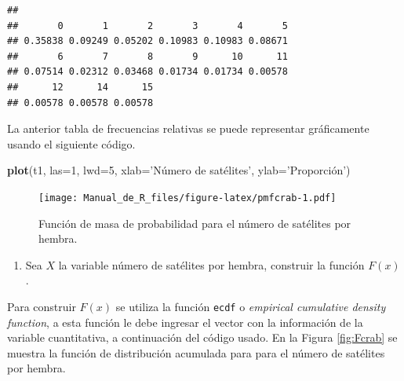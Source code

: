\documentclass[10pt,]{krantz}
\makeatletter
\newenvironment{Shaded}{\begin{snugshade}}{\end{snugshade}}
\newcommand{\KeywordTok}[1]{\textcolor[rgb]{0.13,0.29,0.53}{\textbf{{#1}}}}
\newcommand{\DataTypeTok}[1]{\textcolor[rgb]{0.13,0.29,0.53}{{#1}}}
\newcommand{\DecValTok}[1]{\textcolor[rgb]{0.00,0.00,0.81}{{#1}}}
\newcommand{\StringTok}[1]{\textcolor[rgb]{0.31,0.60,0.02}{{#1}}}
\newcommand{\NormalTok}[1]{{#1}}
\providecommand{\tightlist}{%
  \setlength{\itemsep}{0pt}\setlength{\parskip}{0pt}}
\newenvironment{kframe}{%
\medskip{}
\setlength{\fboxsep}{.8em}
 \def\at@end@of@kframe{}%
 \ifinner\ifhmode%
  \def\at@end@of@kframe{\end{minipage}}%
  \begin{minipage}{\columnwidth}%
 \fi\fi%
 \def\FrameCommand##1{\hskip\@totalleftmargin \hskip-\fboxsep
 \colorbox{shadecolor}{##1}\hskip-\fboxsep
     \hskip-\linewidth \hskip-\@totalleftmargin \hskip\columnwidth}%
 \MakeFramed {\advance\hsize-\width
   \@totalleftmargin\z@ \linewidth\hsize
   \@setminipage}}%
 {\par\unskip\endMakeFramed%
 \at@end@of@kframe}
\renewenvironment{Shaded}{\begin{kframe}}{\end{kframe}}
\makeatother
\begin{document}
\begin{verbatim}
## 
##       0       1       2       3       4       5 
## 0.35838 0.09249 0.05202 0.10983 0.10983 0.08671 
##       6       7       8       9      10      11 
## 0.07514 0.02312 0.03468 0.01734 0.01734 0.00578 
##      12      14      15 
## 0.00578 0.00578 0.00578
\end{verbatim}

La anterior tabla de frecuencias relativas se puede representar
gráficamente usando el siguiente código.

\begin{Shaded}
\begin{Highlighting}[]
\KeywordTok{plot}\NormalTok{(t1, }\DataTypeTok{las=}\DecValTok{1}\NormalTok{, }\DataTypeTok{lwd=}\DecValTok{5}\NormalTok{, }\DataTypeTok{xlab=}\StringTok{'Número de satélites'}\NormalTok{,}
     \DataTypeTok{ylab=}\StringTok{'Proporción'}\NormalTok{)}
\end{Highlighting}
\end{Shaded}

\begin{figure}[htbp]
\centering
\texttt{[image: Manual\_de\_R\_files/figure-latex/pmfcrab-1.pdf]}
\caption{\label{fig:pmfcrab}Función de masa de probabilidad para el número
de satélites por hembra.}
\end{figure}

\begin{enumerate}
\def\labelenumi{\arabic{enumi})}
\setcounter{enumi}{1}
\tightlist
\item
  Sea \(X\) la variable número de satélites por hembra, construir la
  función \(F(x)\).
\end{enumerate}

Para construir \(F(x)\) se utiliza la función \texttt{ecdf} o
\emph{empirical cumulative density function}, a esta función le debe
ingresar el vector con la información de la variable cuantitativa, a
continuación del código usado. En la Figura \ref{fig:Fcrab} se muestra
la función de distribución acumulada para para el número de satélites
por hembra.

\begin{Shaded}
\end{Shaded}
\end{document}
